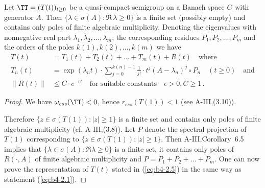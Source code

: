 \begin{theorem}\label{thm:b4-2.10}
	Let $\TT = (T(t))_{t \geq 0}$ be a quasi-compact semigroup on a Banach space $G$ with generator $A$. Then $\{\lambda \in \sigma(A) \colon \Re\,\lambda \geq 0\}$ is a finite set (possibly empty) and contains only poles of finite algebraic multiplicity. Denoting the eigenvalues with nonnegative real part $\lambda_1,\lambda_2, \ldots ,\lambda_m$, the corresponding residues $P_1,P_2, \ldots ,P_m$ and the orders of the poles $k(1),k(2), \ldots, k(m)$ we have
	\begin{equation}\label{eq:b4-2.5}
		\begin{aligned}
		T(t) &= T_1(t) + T_2(t) + \ldots + T_m(t) + R(t) \quad \text{where}\\
		T_n(t) &= \exp(\lambda_nt) \cdot \sum_{j=0}^{k(n)-1} \frac{1}{j!} \cdot t^j (A - \lambda_n)^j \circ P_n \quad (t \geq 0) \quad \text{and}\\
		\|R(t)\| &\leq C \cdot e^{-\epsilon t} \quad \text{for suitable constants} \quad \epsilon > 0, C \geq 1\,.		
		\end{aligned}
	\end{equation}
\end{theorem}

\begin{proof} We have $\omega_{ess}(\TT) < 0$, hence $r_{ess}(T(1)) < 1$ (see A-III,(3.10)).

Therefore $\{z \in \sigma(T(1)) \colon |z| \geq 1\}$ is a finite set and contains only poles of finite algebraic multiplicity (cf. A-III,(3.8)). Let $P$ denote the spectral projection of $T(1)$ corresponding to $\{z \in \sigma(T(1))\colon |z| \geq 1\}$. Then A-III,Corollary~6.5 implies that $\{\lambda \in \sigma(A) \colon \Re  \lambda \geq 0\}$ is a finite set, it contains only poles of $R(\cdot,A)$ of finite algebraic multiplicity and $P = P_1+P_2+ \ldots +P_m$. One can now prove the representation of $T(t)$ stated in (\ref{eq:b4-2.5}) in the same way as statement (\ref{eq:b4-2.1}).
\end{proof}



